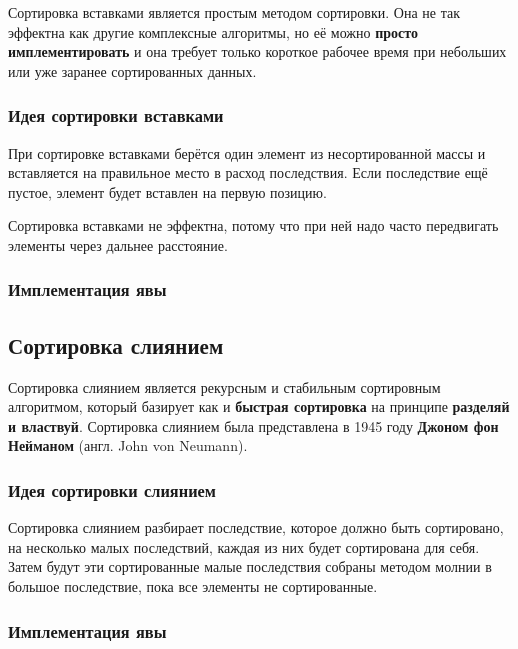 \documentclass[11pt, a4paper, titlepage, twoside]{article}
\renewcommand{\emph}{\textbf}
\begin{document}
	Сортировка вставками является простым методом сортировки. Она не так эффектна как другие комплексные алгоритмы, но её можно \emph{просто имплементировать} и она требует только короткое рабочее время при небольших или уже заранее сортированных данных.
	
	\subsubsection{Идея сортировки вставками}
	
	При сортировке вставками берётся один элемент из несортированной массы и вставляется на правильное место в расход последствия. Если последствие ещё пустое, элемент будет вставлен на первую позицию.
	
	Сортировка вставками не эффектна, потому что при ней надо часто передвигать элементы через дальнее расстояние.
	
	\subsubsection{Имплементация явы}
	
	
	
	\subsection{Сортировка слиянием}
	
	Сортировка слиянием является рекурсным и стабильным сортировным алгоритмом, который базирует как и \emph{быстрая сортировка} на принципе \emph{разделяй и властвуй}. Сортировка слиянием была представлена в 1945 году \emph{Джоном фон Нейманом} (англ. John von Neumann).
	
	\subsubsection{Идея сортировки слиянием}
	
	Сортировка слиянием разбирает последствие, которое должно быть сортировано, на несколько малых последствий, каждая из них будет сортирована для себя. Затем будут эти сортированные малые последствия собраны методом молнии в большое последствие, пока все элементы не сортированные.
	
	\subsubsection{Имплементация явы}
	
\end{document}

